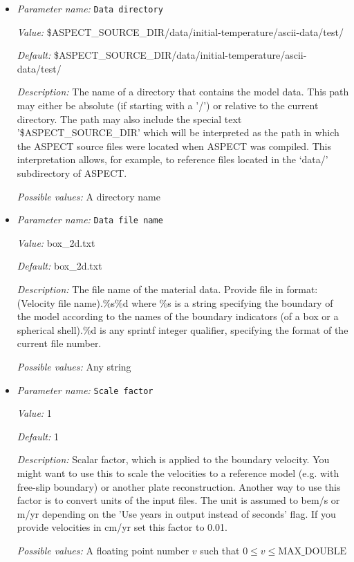 \begin{itemize}
\item {\it Parameter name:} {\tt Data directory}
\label{parameters:Initial temperature model/Ascii data model/Data directory}


{\it Value:} \$ASPECT\_SOURCE\_DIR/data/initial-temperature/ascii-data/test/


{\it Default:} \$ASPECT\_SOURCE\_DIR/data/initial-temperature/ascii-data/test/


{\it Description:} The name of a directory that contains the model data. This path may either be absolute (if starting with a '/') or relative to the current directory. The path may also include the special text '\$ASPECT\_SOURCE\_DIR' which will be interpreted as the path in which the ASPECT source files were located when ASPECT was compiled. This interpretation allows, for example, to reference files located in the `data/' subdirectory of ASPECT. 


{\it Possible values:} A directory name
\item {\it Parameter name:} {\tt Data file name}
\label{parameters:Initial temperature model/Ascii data model/Data file name}


{\it Value:} box\_2d.txt


{\it Default:} box\_2d.txt


{\it Description:} The file name of the material data. Provide file in format: (Velocity file name).\%s\%d where \%s is a string specifying the boundary of the model according to the names of the boundary indicators (of a box or a spherical shell).\%d is any sprintf integer qualifier, specifying the format of the current file number. 


{\it Possible values:} Any string
\item {\it Parameter name:} {\tt Scale factor}
\label{parameters:Initial temperature model/Ascii data model/Scale factor}


{\it Value:} 1


{\it Default:} 1


{\it Description:} Scalar factor, which is applied to the boundary velocity. You might want to use this to scale the velocities to a reference model (e.g. with free-slip boundary) or another plate reconstruction. Another way to use this factor is to convert units of the input files. The unit is assumed to bem/s or m/yr depending on the 'Use years in output instead of seconds' flag. If you provide velocities in cm/yr set this factor to 0.01.


{\it Possible values:} A floating point number $v$ such that $0 \leq v \leq \text{MAX\_DOUBLE}$
\end{itemize}

